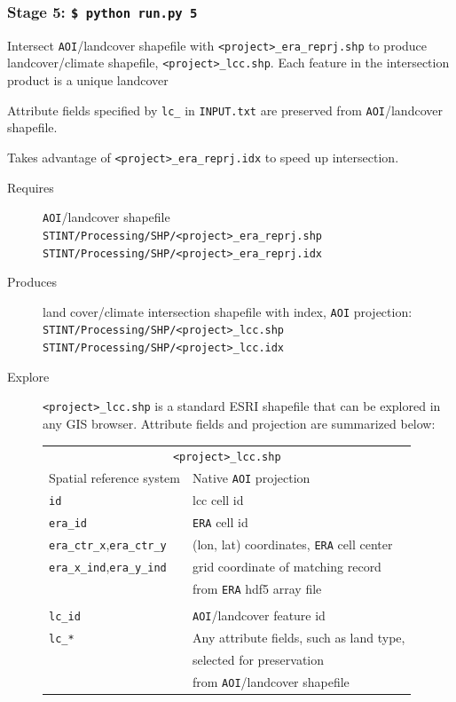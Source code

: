 \documentclass[twoside,a4paper]{refart}
\begin{document}
\subsubsection{\textbf{Stage 5:} \texttt{\$ python run.py 5}}
Intersect \texttt{AOI}/landcover shapefile with \texttt{<project>\_era\_reprj.shp} to produce landcover/climate shapefile, \texttt{<project>\_lcc.shp}.  Each feature in the intersection product is a unique landcover 
          
Attribute fields specified by \texttt{lc\_} in \texttt{INPUT.txt} are preserved from \texttt{AOI}/landcover shapefile.
          
Takes advantage of \texttt{<project>\_era\_reprj.idx} to speed up intersection.

  \begin{description}
    \item [Requires]
      \texttt{AOI}/landcover shapefile\\
      \texttt{STINT/Processing/SHP/<project>\_era\_reprj.shp}\\
      \texttt{STINT/Processing/SHP/<project>\_era\_reprj.idx}  
  
  
    \item [Produces]
      land cover/climate intersection shapefile with index, 
      \texttt{AOI} projection:\\
      \texttt{STINT/Processing/SHP/<project>\_lcc.shp}\\
      \texttt{STINT/Processing/SHP/<project>\_lcc.idx}

    \item [Explore]
      \texttt{<project>\_lcc.shp} is a standard ESRI shapefile that can be explored in any GIS browser.  Attribute fields and projection are summarized below:
      
\begin{tabular}{ll}
       \multicolumn{2}{c}{\texttt{<project>\_lcc.shp}} \\
Spatial reference system        & Native \texttt{AOI} projection \\
\texttt{id}                     & lcc cell id \\  
\texttt{era\_id}                & \texttt{ERA} cell id \\  
\texttt{era\_ctr\_x},\texttt{era\_ctr\_y} & (lon, lat) coordinates, \texttt{ERA} cell center \\
\texttt{era\_x\_ind},\texttt{era\_y\_ind} & grid coordinate of matching record \\
                                          & from \texttt{ERA} hdf5 array file\\
\\
\texttt{lc\_id}                & \texttt{AOI}/landcover feature id \\
\texttt{lc\_*}                & Any attribute fields, such as land type, \\
                             & selected for preservation \\
                             & from \texttt{AOI}/landcover shapefile \\

\end{tabular}
  \end{description}
\end{document}

